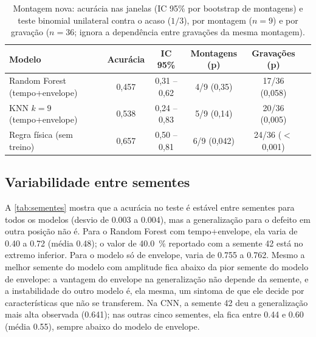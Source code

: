 \begin{table}[htb]
  \centering
  \caption{Montagem nova: acurácia nas janelas (IC 95\% por bootstrap de
  montagens) e teste binomial unilateral contra o acaso ($1/3$), por montagem
  ($n = 9$) e por gravação ($n = 36$; ignora a dependência entre gravações da
  mesma montagem).}
  \label{tab:montagem-inferencia}
  \scriptsize
  \begin{tabular}{lccccc}
    \toprule
    \textbf{Modelo} & \textbf{Acurácia} & \textbf{IC 95\%} &
    \textbf{Montagens (p)} & \textbf{Gravações (p)} \\
    \midrule
    Random Forest (tempo+envelope) & 0,457 & 0,31 -- 0,62 & 4/9 (0,35)  & 17/36 (0,058) \\
    KNN $k=9$ (tempo+envelope)     & 0,538 & 0,24 -- 0,83 & 5/9 (0,14)  & 20/36 (0,005) \\
    Regra física (sem treino)      & 0,657 & 0,50 -- 0,81 & 6/9 (0,042) & 24/36 ($<$0,001) \\
    \bottomrule
  \end{tabular}
\end{table}

\subsection{Variabilidade entre sementes}
\label{sec:res-sementes}

A \autoref{tab:sementes} mostra que a
acurácia no teste é estável entre sementes para todos os modelos (desvio de
\num{0.003} a \num{0.004}), mas a generalização para o defeito em outra posição
não é. Para o Random Forest com tempo+envelope, ela varia de \num{0.40} a
\num{0.72} (média \num{0.48}); o valor de \SI{40.0}{\percent} reportado com a
semente 42 está no extremo inferior. Para o modelo só de envelope, varia de
\num{0.755} a \num{0.762}. Mesmo a melhor semente do modelo com amplitude fica
abaixo da pior semente do modelo de envelope: a vantagem do envelope na
generalização não depende da semente, e a instabilidade do outro modelo é, ela
mesma, um sintoma de que ele decide por características que não se transferem.
Na CNN, a semente 42 deu a generalização mais alta observada (\num{0.641}); nas
outras cinco sementes, ela fica entre \num{0.44} e \num{0.60} (média
\num{0.55}), sempre abaixo do modelo de envelope.

